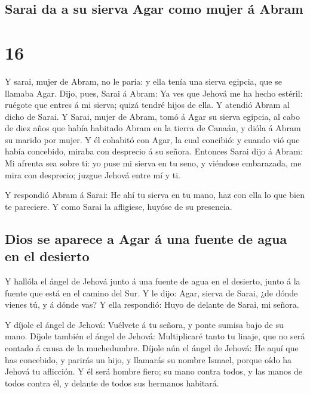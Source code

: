 \hypertarget{sarai-da-a-su-sierva-agar-como-mujer-uxe1-abram}{%
\subsection{Sarai da a su sierva Agar como mujer á
Abram}\label{sarai-da-a-su-sierva-agar-como-mujer-uxe1-abram}}

\hypertarget{section-15}{%
\section{16}\label{section-15}}

 Y sarai, mujer de Abram, no le paría: y ella tenía una
sierva egipcia, que se llamaba Agar.  Dijo, pues, Sarai á
Abram: Ya ves que Jehová me ha hecho estéril: ruégote que entres á mi
sierva; quizá tendré hijos de ella. Y atendió Abram al dicho de Sarai.
 Y Sarai, mujer de Abram, tomó á Agar su sierva egipcia, al
cabo de diez años que había habitado Abram en la tierra de Canaán, y
dióla á Abram su marido por mujer.  Y él cohabitó con Agar,
la cual concibió: y cuando vió que había concebido, miraba con desprecio
á su señora.  Entonces Sarai dijo á Abram: Mi afrenta sea
sobre ti: yo puse mi sierva en tu seno, y viéndose embarazada, me mira
con desprecio; juzgue Jehová entre mí y ti.

 Y respondió Abram á Sarai: He ahí tu sierva en tu mano, haz
con ella lo que bien te pareciere. Y como Sarai la afligiese, huyóse de
su presencia.

\hypertarget{dios-se-aparece-a-agar-uxe1-una-fuente-de-agua-en-el-desierto}{%
\subsection{Dios se aparece a Agar á una fuente de agua en el
desierto}\label{dios-se-aparece-a-agar-uxe1-una-fuente-de-agua-en-el-desierto}}

 Y hallóla el ángel de Jehová junto á una fuente de agua en
el desierto, junto á la fuente que está en el camino del Sur.
 Y le dijo: Agar, sierva de Sarai, ¿de dónde vienes tú, y á
dónde vas? Y ella respondió: Huyo de delante de Sarai, mi señora.

 Y díjole el ángel de Jehová: Vuélvete á tu señora, y ponte
sumisa bajo de su mano.  Díjole también el ángel de Jehová:
Multiplicaré tanto tu linaje, que no será contado á causa de la
muchedumbre.  Díjole aún el ángel de Jehová: He aquí que
has concebido, y parirás un hijo, y llamarás su nombre Ismael, porque
oído ha Jehová tu aflicción.  Y él será hombre fiero; su
mano contra todos, y las manos de todos contra él, y delante de todos
sus hermanos habitará.

